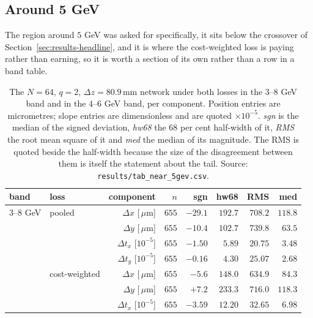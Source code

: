 \documentclass[11pt,a4paper]{article}
\newcommand{\um}{\ensuremath{\,\mu\mathrm{m}}}
\newcommand{\mm}{\ensuremath{\,\mathrm{mm}}}
\begin{document}
\subsection{Around 5 GeV}
\label{sec:results-5gev}

The region around $5$ GeV was asked for specifically, it sits below the
crossover of Section~\ref{sec:results-headline}, and it is where the
cost-weighted loss is paying rather than earning, so it is worth a section of
its own rather than a row in a band table.

\begin{table}[tbp]
  \centering
  \caption{The $N = 64$, $q = 2$, $\Delta z = 80.9\mm$ network under both losses
  in the $3$--$8$ GeV band and in the $4$--$6$ GeV band, per component. Position
  entries are micrometres; slope entries are dimensionless and are quoted
  $\times 10^{-5}$. \emph{sgn} is the median of the signed deviation,
  \emph{hw68} the $68$ per cent half-width of it, \emph{RMS} the root mean
  square of it and \emph{med} the median of its magnitude. The RMS is quoted
  beside the half-width because the size of the disagreement between them is
  itself the statement about the tail. Source:
  \texttt{results/tab\_near\_5gev.csv}.}
  \label{tab:near5}
  \footnotesize
  \setlength{\tabcolsep}{5pt}
  \begin{tabular}{llrrrrrr}
    \toprule
    band & loss & component & $n$ & sgn & hw68 & RMS & med \\
    \midrule
    $3$--$8$ GeV & pooled        & $\Delta x$ [\!\um]      & $655$ & $-29.1$ & $192.7$ & $708.2$ & $118.8$ \\
                 &               & $\Delta y$ [\!\um]      & $655$ & $-10.4$ & $102.7$ & $739.8$ & $63.5$ \\
                 &               & $\Delta t_x$ [$10^{-5}$] & $655$ & $-1.50$ & $5.89$  & $20.75$ & $3.48$ \\
                 &               & $\Delta t_y$ [$10^{-5}$] & $655$ & $-0.16$ & $4.30$  & $25.07$ & $2.68$ \\
    \addlinespace
                 & cost-weighted & $\Delta x$ [\!\um]      & $655$ & $-5.6$  & $148.0$ & $634.9$ & $84.3$ \\
                 &               & $\Delta y$ [\!\um]      & $655$ & $+7.2$  & $233.3$ & $716.0$ & $118.3$ \\
                 &               & $\Delta t_x$ [$10^{-5}$] & $655$ & $-3.59$ & $12.20$ & $32.65$ & $6.98$ \\

\end{tabular}
\end{table}
\end{document}
